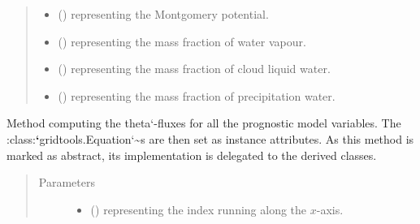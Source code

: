 \documentclass[letterpaper,10pt,english]{sphinxmanual}
\begin{document}
\begin{fulllineitems}
\begin{fulllineitems}
\begin{quote}
\begin{description}
\begin{itemize}
\item {} 
 () \textendash{}  representing the Montgomery potential.

\item {} 
 () \textendash{}  representing the mass fraction of water vapour.

\item {} 
 () \textendash{}  representing the mass fraction of cloud liquid water.

\item {} 
 () \textendash{}  representing the mass fraction of precipitation water.

\end{itemize}

\end{description}\end{quote}

\end{fulllineitems}


\begin{fulllineitems}
\label{\detokenize{api:dycore.flux_isentropic_nonconservative.FluxIsentropicNonconservative._compute_vertical_fluxes}}
Method computing the theta{}`-fluxes for all the
prognostic model variables. The :class:{\color{red}\bfseries{}{}`}gridtools.Equation{}`\textasciitilde{}s are then set as instance attributes.
As this method is marked as abstract, its implementation is delegated to the derived classes.
\begin{quote}\begin{description}
\item[{Parameters}] \leavevmode\begin{itemize}
\item {} 
 () \textendash{}  representing the index running along the \(x\)-axis.


\end{itemize}
\end{description}
\end{quote}
\end{fulllineitems}
\end{fulllineitems}
\end{document}
